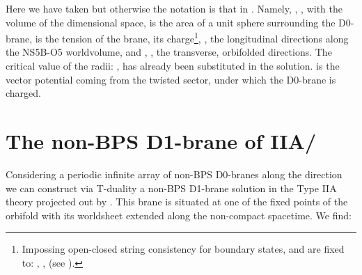 \documentclass[12pt,a4paper]{article}
\begin{document}
\noindent Here we have taken \coordHE{} but otherwise the
notation is that in \cite{EP}. Namely, \coordHE{},
\coordHE{}, with \coordHE{} the volume of the
\coordHE{} dimensional space,
\coordHE{} is the area of a unit sphere surrounding the D0-brane, 
\coordHE{} is the tension of the brane, \coordHE{} its 
charge\footnote{Impossing open-closed string consistency for 
boundary states, \coordHE{} and \coordHE{} are fixed to: \coordHE{}, 
\coordHE{}, (see \cite{EP}).}, 
\coordHE{}, \coordHE{} the longitudinal directions along the NS5B-O5
worldvolume, and
\coordHE{}, \coordHE{}, the transverse, orbifolded directions. 
The critical value of the
radii: \coordHE{}, has already been substituted in the solution.
\coordHE{} is the vector potential coming from the twisted sector,
under which the D0-brane is charged.





\section{The non-BPS D1-brane of IIA/\coordHE{}}

Considering a periodic infinite array of non-BPS D0-branes
along the \coordHE{} direction we can construct via T-duality 
a non-BPS D1-brane solution in the Type IIA theory
projected out by \coordHE{}. 
This brane is situated at one of the fixed points of the orbifold
with its worldsheet extended along the non-compact spacetime.
We find:
\end{document}

